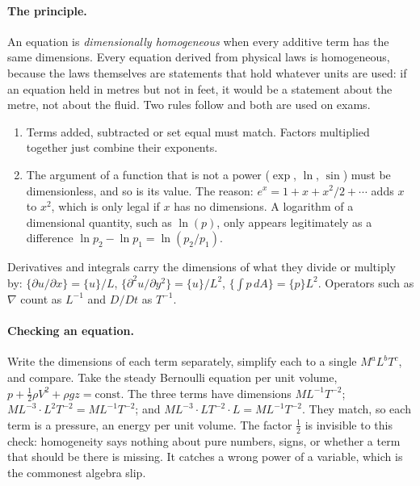 \paragraph{The principle.} An equation is \emph{dimensionally homogeneous} when every additive term has the same dimensions. Every equation derived from physical laws is homogeneous, because the laws themselves are statements that hold whatever units are used: if an equation held in metres but not in feet, it would be a statement about the metre, not about the fluid. Two rules follow and both are used on exams.
\begin{enumerate}[nosep,leftmargin=*]
\item Terms added, subtracted or set equal must match. Factors multiplied together just combine their exponents.
\item The argument of a function that is not a power ($\exp$, $\ln$, $\sin$) must be dimensionless, and so is its value. The reason: $e^x = 1 + x + x^2/2 + \cdots$ adds $x$ to $x^2$, which is only legal if $x$ has no dimensions. A logarithm of a dimensional quantity, such as $\ln(p)$, only appears legitimately as a difference $\ln p_2 - \ln p_1 = \ln(p_2/p_1)$.
\end{enumerate}
Derivatives and integrals carry the dimensions of what they divide or multiply by: $\{\partial u/\partial x\} = \{u\}/L$, $\{\partial^2 u/\partial y^2\} = \{u\}/L^2$, $\{\int p \, dA\} = \{p\} L^2$. Operators such as $\nabla$ count as $L^{-1}$ and $D/Dt$ as $T^{-1}$.

\paragraph{Checking an equation.} Write the dimensions of each term separately, simplify each to a single $M^aL^bT^c$, and compare. Take the steady Bernoulli equation per unit volume, $p + \tfrac12 \rho V^2 + \rho g z = \text{const}$. The three terms have dimensions $ML^{-1}T^{-2}$; $ML^{-3} \cdot L^2T^{-2} = ML^{-1}T^{-2}$; and $ML^{-3} \cdot LT^{-2} \cdot L = ML^{-1}T^{-2}$. They match, so each term is a pressure, an energy per unit volume. The factor $\tfrac12$ is invisible to this check: homogeneity says nothing about pure numbers, signs, or whether a term that should be there is missing. It catches a wrong power of a variable, which is the commonest algebra slip.


